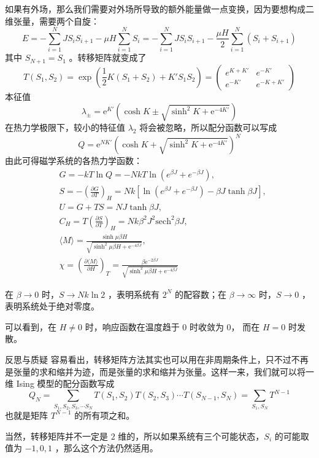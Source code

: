 如果有外场，那么我们需要对外场所导致的额外能量做一点变换，因为要想构成二维张量，需要两个自旋：
\[
    E = -\sum_{i=1}^N JS_i S_{i+1} - \mu H\sum_{i=1}^N S_i = -\sum_{i=1}^N JS_i S_{i+1} - \frac{\mu H}{2} \sum_{i=1}^N (S_i + S_{i+1})
\]
其中 $S_{N+1} = S_1$ 。转移矩阵就变成了
\begin{equation}
    T(S_1,S_2) = \exp(\frac{1}{2}K (S_1+S_2) + K' S_1 S_{2}) = \begin{pmatrix}
        e^{K+K'} & e^{-K'} \\
        e^{-K'} & e^{-K+K'}
    \end{pmatrix} 
\end{equation}
本征值
\begin{equation}
    \lambda_\pm = \mathrm{e}^{ K'}\left(\cosh K \pm \sqrt{\sinh ^2 K + \mathrm{e}^{-4 K'}}\right)
\end{equation}
在热力学极限下，较小的特征值 $\lambda_2$ 将会被忽略，所以配分函数可以写成
\begin{equation}
    Q=\mathrm{e}^{N K'}\left(\cosh K+\sqrt{\sinh ^2 K+\mathrm{e}^{-4 K'}}\right)^N
\end{equation}
由此可得磁学系统的各热力学函数：
\begin{align*}
    &G = -kT\ln Q = -NkT \ln (e^{\beta J} + e^{-\beta J}), \\
    &S = -\left(\frac{\partial G}{\partial T}\right)_{H} = Nk\left[\ln (e^{\beta J} + e^{-\beta J}) - \beta J \tanh\beta J\right],\\
    &U = G + TS =  NJ \tanh\beta J,\\
    &C_H = T\left(\frac{\partial S}{\partial T}\right)_H = Nk\beta^2 J^2 \mathrm{sech}^2 \beta J,\\
    &\langle M \rangle = \frac{\sinh \mu \beta H}{\sqrt{\sinh ^2 \mu \beta H+\mathrm{e}^{-4 \beta J}}},\\
    &\chi = \left(\frac{\partial \langle M \rangle}{\partial H}\right)_T = \frac{\beta \mathrm{e}^{-2 \beta J}}{\sqrt{\sinh ^2 \mu \beta H+\mathrm{e}^{-4 \beta J}}}
\end{align*}

在 $\beta \rightarrow 0$ 时，$S \rightarrow Nk\ln 2$ ，表明系统有 $2^N$ 的配容数；在 $\beta \rightarrow \infty$ 时，$S \rightarrow 0$ ，表明系统处于绝对零度。
 
可以看到，在 $H \neq 0$ 时，响应函数在温度趋于 $0$ 时收敛为 0， 而在 $H = 0$ 时发散。

\begin{justification}{\kaishu 反思与质疑}
\kaishu \fontsize{11pt}{16pt}
\quad\quad 容易看出，转移矩阵方法其实也可以用在非周期条件上，只不过不再是张量的求和缩并为迹，而是张量的求和缩并为张量。这样一来，我们就可以将一维 Ising 模型的配分函数写成
\begin{equation}
    Q_N = \sum_{S_1,S_2,S_3,\cdots S_N} T(S_1,S_2) T(S_2,S_3) \cdots T(S_{N-1},S_{N}) = \sum_{S_1, S_N} T^{N-1}
\end{equation}
也就是矩阵 $T^{N-1}$ 的所有项之和。

\quad\quad 当然，转移矩阵并不一定是 $2$ 维的，所以如果系统有三个可能状态，$S_i$ 的可能取值为 $-1,0,1$ ，那么这个方法仍然适用。
\end{justification}
